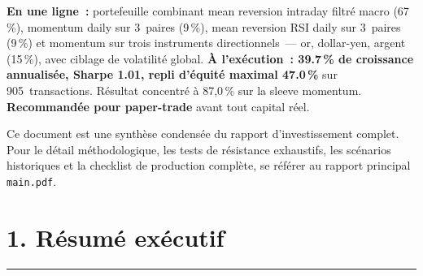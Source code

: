 \documentclass[11pt, a4paper]{scrartcl}
\begin{document}
\vspace{0.8cm}

\begin{thesisbox}
\textbf{En une ligne~:} portefeuille combinant mean reversion intraday filtré macro
(67\,\%), momentum daily sur 3~paires (9\,\%), mean reversion RSI daily sur 3~paires
(9\,\%) et momentum sur trois instruments directionnels~--- or, dollar-yen, argent
(15\,\%), avec ciblage de volatilité global.
\textbf{À l'exécution~: 39.7\,\% de croissance annualisée, Sharpe
1.01, repli d'équité maximal 47.0\,\%} sur
905~transactions. Résultat concentré à 87,0\,\% sur la sleeve momentum.
\textbf{Recommandée pour paper-trade} avant tout capital réel.
\end{thesisbox}

\vspace{0.4cm}

{\small\color{slateGrey}\sffamily
Ce document est une synthèse condensée du rapport d'investissement complet. Pour le détail
méthodologique, les tests de résistance exhaustifs, les scénarios historiques et la
checklist de production complète, se référer au rapport principal \texttt{main.pdf}.}

\vfill

\noindent\colorbox{lightGrey}{%
}

\vspace{0.3cm}

\noindent{\color{apogeeGold}\rule{\textwidth}{2pt}}

\clearpage

\section*{1. Résumé exécutif}
\vspace{-0.4em}
{\color{accent}\rule{\linewidth}{1.0pt}}\\[0.4em]
\end{document}
